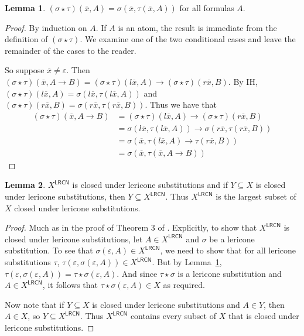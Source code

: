 \documentclass{amsart}
\theoremstyle{definition}
\newtheorem{lemma}{Lemma}
\newcommand{\LRCN}{\mathsf{LRCN}}
\newcommand{\lrcnclose}[1]{#1^{\LRCN}}
\begin{document}
\begin{lemma}\label{lemma:star}
    $(\sigma\star\tau)(\overline{x},A)=\sigma(\overline{x},\tau(\overline{x},A))$ for all formulas $A$.
\end{lemma}
\begin{proof}
    By induction on $A$. If $A$ is an atom, the result is immediate from the definition of $(\sigma\star\tau)$. We examine one of the two conditional cases and leave the remainder of the cases to the reader.

    So suppose $\overline{x}\neq\varepsilon$. Then $(\sigma\star\tau)(\overline{x},A\to B)=(\sigma\star\tau)(l\overline{x},A)\to(\sigma\star\tau)(r\overline{x},B)$. By IH, $(\sigma\star\tau)(l\overline{x},A)=\sigma(l\overline{x},\tau(l\overline{x},A))$ and $(\sigma\star\tau)(r\overline{x},B)=\sigma(r\overline{x},\tau(r\overline{x},B))$. Thus we have that
    \begin{align*}
        (\sigma\star\tau)(\overline{x},A\to B)
         & =(\sigma\star\tau)(l\overline{x},A)\to(\sigma\star\tau)(r\overline{x},B) \\
         & = \sigma(l\overline{x},\tau(l\overline{x},A))\to \sigma(r\overline{x},\tau(r\overline{x},B)) \\
         & = \sigma(\overline{x},\tau(l\overline{x},A)\to\tau(r\overline{x},B)) \\
         & = \sigma(\overline{x},\tau(\overline{x},A\to B))
    \end{align*}
\end{proof}

\begin{lemma}\label{lemma:largest}
    $\lrcnclose{X}$ is closed under lericone substitutions and if $Y\subseteq X$ is closed under lericone substitutions, then $Y\subseteq \lrcnclose{X}$. Thus $\lrcnclose{X}$ is the largest subset of $X$ closed under lericone substitutions. 
\end{lemma}
\begin{proof}
    Much as in the proof of Theorem 3 of \citet{Leach-Krouse2024-LEALIT-4}. Explicitly, to show that $\lrcnclose{X}$ is closed under lericone substitutions, let $A\in\lrcnclose{X}$ and $\sigma$ be a lericone substitution. To see that $\sigma(\varepsilon,A)\in\lrcnclose{X}$, we need to show that for all lericone substitutions $\tau$, $\tau(\varepsilon,\sigma(\varepsilon,A))\in\lrcnclose{X}$. But by Lemma~\ref{lemma:star}, $\tau(\varepsilon,\sigma(\varepsilon,A))=\tau\star\sigma(\varepsilon,A)$. And since $\tau\star\sigma$ is a lericone substitution and $A\in\lrcnclose{X}$, it follows that $\tau\star\sigma(\varepsilon,A)\in X$ as required.
    
    Now note that if $Y\subseteq X$ is closed under lericone substitutions and $A\in Y$, then $A\in X$, so $Y\subseteq \lrcnclose{X}$. Thus $\lrcnclose{X}$ contains every subset of $X$ that is closed under lericone substitutions.
\end{proof}
\end{document}
